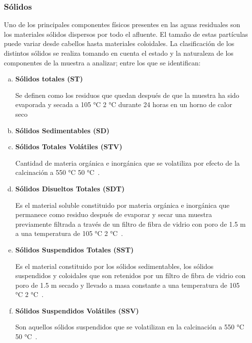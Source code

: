 \subsubsection*{Sólidos}
Uno de los principales componentes físicos presentes en las aguas residuales son los materiales sólidos dispersos por todo el afluente. El tamaño de estas partículas puede variar desde cabellos hasta materiales coloidales. La clasificación de los distintos sólidos se realiza tomando en cuenta el estado y la naturaleza de los componentes de la muestra a analizar; entre los que se identifican:
\begin{enumerate}[a.]
	\item \textbf{Sólidos totales (ST)}\par
	Se definen como los residuos que quedan después de que la muestra ha sido evaporada y secada a 105 °C  2 °C durante 24 horas en un horno de calor seco~\citep{Economia2015}
	\item \textbf{Sólidos Sedimentables (SD)} \par
	
	\item \textbf{Sólidos Totales Volátiles (STV)} \par
	Cantidad de materia orgánica e inorgánica que se volatiliza por efecto de la calcinación a 550 °C  50 °C~\citep{Economia2015}.
	\item \textbf{Sólidos Disueltos Totales (SDT)} \par
	Es el material soluble constituido por materia orgánica e inorgánica que permanece como residuo después de evaporar y secar una muestra previamente filtrada a través de un filtro de fibra de vidrio con poro de 1.5 m a una temperatura de 105 °C  2 °C~\citep{Economia2015}.
	\item \textbf{Sólidos Suspendidos Totales (SST)} \par
	Es el material constituido por los sólidos sedimentables, los sólidos  suspendidos y coloidales que son retenidos por un filtro de fibra de vidrio con poro de 1.5 m secado y llevado a masa constante a una temperatura de 105 °C  2 °C~\citep{Economia2015}.
	\item \textbf{Sólidos Suspendidos Volátiles (SSV)} \par                                                                  
	Son aquellos sólidos suspendidos que se volatilizan en la calcinación a 550 °C  50 °C~\citep{Economia2015}.
\end{enumerate}

